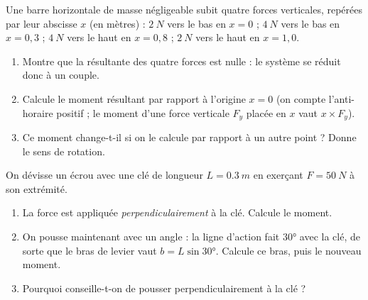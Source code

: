 \documentclass[11pt,a4paper]{article}
\begin{document}
\begin{exo}
Une barre horizontale de masse négligeable subit quatre forces verticales, repérées par leur abscisse
$x$ (en mètres) : $\qty{2}{N}$ vers le bas en $x=0$ ; $\qty{4}{N}$ vers le bas en $x=0{,}3$ ;
$\qty{4}{N}$ vers le haut en $x=0{,}8$ ; $\qty{2}{N}$ vers le haut en $x=1{,}0$.
\begin{center}
\end{center}
\begin{enumerate}[label=\alph*)]
  \item Montre que la résultante des quatre forces est nulle : le système se réduit donc à un couple.
  \item Calcule le moment résultant par rapport à l'origine $x=0$ (on compte l'anti-horaire positif ;
        le moment d'une force verticale $F_y$ placée en $x$ vaut $x\times F_y$).
  \item Ce moment change-t-il si on le calcule par rapport à un autre point ? Donne le sens de rotation.
\end{enumerate}
\end{exo}

\begin{exo}
On dévisse un écrou avec une clé de longueur $L=\qty{0.3}{m}$ en exerçant $F=\qty{50}{N}$ à son
extrémité.
\begin{enumerate}[label=\alph*)]
  \item La force est appliquée \emph{perpendiculairement} à la clé. Calcule le moment.
  \item On pousse maintenant avec un angle : la ligne d'action fait $\ang{30}$ avec la clé, de sorte que
        le bras de levier vaut $b=L\sin\ang{30}$. Calcule ce bras, puis le nouveau moment.
  \item Pourquoi conseille-t-on de pousser perpendiculairement à la clé ?
\end{enumerate}
\end{exo}
\end{document}

